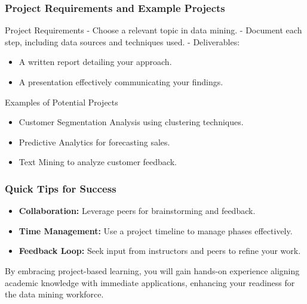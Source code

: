 \documentclass[aspectratio=169]{beamer}
\begin{document}
\begin{frame}[fragile]
    \frametitle{Project Requirements and Example Projects}
    \begin{block}{Project Requirements}
        - Choose a relevant topic in data mining.
        - Document each step, including data sources and techniques used.
        - Deliverables:
        \begin{itemize}
            \item A written report detailing your approach.
            \item A presentation effectively communicating your findings.
        \end{itemize}
    \end{block}
    
    \begin{block}{Examples of Potential Projects}
        \begin{itemize}
            \item Customer Segmentation Analysis using clustering techniques.
            \item Predictive Analytics for forecasting sales.
            \item Text Mining to analyze customer feedback.
        \end{itemize}
    \end{block}
\end{frame}

\begin{frame}[fragile]
    \frametitle{Quick Tips for Success}
    \begin{itemize}
        \item \textbf{Collaboration:} Leverage peers for brainstorming and feedback.
        \item \textbf{Time Management:} Use a project timeline to manage phases effectively.
        \item \textbf{Feedback Loop:} Seek input from instructors and peers to refine your work.
    \end{itemize}
    
    By embracing project-based learning, you will gain hands-on experience aligning academic knowledge with immediate applications, enhancing your readiness for the data mining workforce.
\end{frame}
\end{document}
